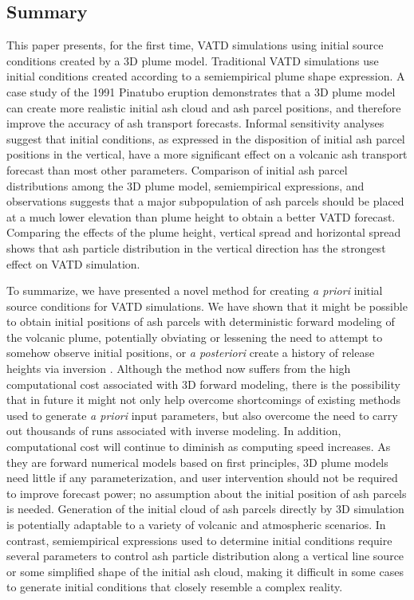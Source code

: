\documentclass[utf8]{frontiersSCNS} %
\begin{document}
\subsection{Summary}
This paper presents, for the first time, VATD simulations using initial source conditions created by a 3D plume model. Traditional VATD simulations use initial conditions created according to a semiempirical plume shape expression. A case study of the 1991 Pinatubo eruption demonstrates that a 3D plume model can create more realistic initial ash cloud and ash parcel positions, and therefore improve the accuracy of ash transport forecasts. Informal sensitivity analyses suggest that initial conditions, as expressed in the disposition of initial ash parcel positions in the vertical, have a more significant effect on a volcanic ash transport forecast than most other parameters. Comparison of initial ash parcel distributions among the 3D plume model, semiempirical expressions, and observations suggests that a major subpopulation of ash parcels should be placed at a much lower elevation than plume height to obtain a better VATD forecast. Comparing the effects of the plume height, vertical spread and horizontal spread shows that ash particle distribution in the vertical direction has the strongest effect on VATD simulation.

To summarize, we have presented a novel method for creating \textit{a priori} initial source conditions for VATD simulations. We have shown that it might be possible to obtain initial positions of ash parcels with deterministic forward modeling of the volcanic plume, potentially obviating or lessening the need to attempt to somehow observe initial positions, or \textit{a posteriori} create a history of release heights via inversion \citep{stohl2011determination}. Although the method now suffers from the high computational cost associated with 3D forward modeling, there is the possibility that in future it might not only help overcome shortcomings of existing methods used to generate \textit{a priori} input parameters, but also overcome the need to carry out thousands of runs associated with inverse modeling. In addition, computational cost will continue to diminish as computing speed increases. As they are forward numerical models based on first principles, 3D plume models need little if any parameterization, and user intervention should not be required to improve forecast power; no assumption about the initial position of ash parcels is needed. Generation of the initial cloud of ash parcels directly by 3D simulation is potentially adaptable to a variety of volcanic and atmospheric scenarios. In contrast, semiempirical expressions used to determine initial conditions require several parameters to control ash particle distribution along a vertical line source or some simplified shape of the initial ash cloud, making it difficult in some cases to generate initial conditions that closely resemble a complex reality.
\end{document}
